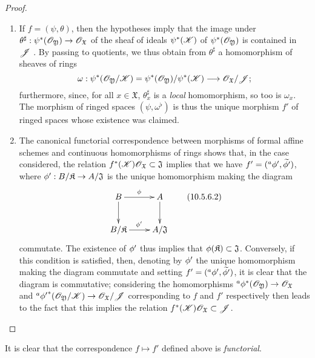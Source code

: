 \begin{proof}
\label{proof-1.10.5.6}
\medskip\noindent
\begin{enumerate}[label=(\roman*)]
  \item If $f=(\psi,\theta)$, then the hypotheses imply that the image under $\theta^\sharp:\psi^*(\sh{O}_\mathfrak{Y})\to\sh{O}_\mathfrak{X}$ of the sheaf of ideals $\psi^*(\mathscr{K})$ of $\psi^*(\mathscr{O}_\mathfrak{Y})$ is contained in $\mathscr{J}$ .
    By passing to quotients, we thus obtain from $\theta^\sharp$ a homomorphism of sheaves of rings
    \[
      \omega:\psi^*(\sh{O}_\mathfrak{Y}/\sh{K})=\psi^*(\sh{O}_\mathfrak{Y})/\psi^*(\sh{K})\to\sh{O}_\mathfrak{X}/\sh{J};
    \]
    furthermore, since, for all $x\in\mathfrak{X}$, $\theta_x^\sharp$ is a \emph{local} homomorphism, so too is $\omega_x$.
    The morphism of ringed spaces $(\psi,\omega^\flat)$ is thus  the unique morphism $f'$ of ringed spaces whose existence was claimed.
  \item The canonical functorial correspondence between morphisms of formal affine schemes and continuous homomorphisms of rings  shows that, in the case considered, the relation $f^*(\mathscr{K})\mathscr{O}_\mathfrak{X}\subset\mathfrak{J}$ implies that we have $f'=({}^a\phi',\widetilde{\phi'})$, where $\vphi':B/\mathfrak{K}\to A/\mathfrak{J}$ is the unique homomorphism making the diagram
    \begin{equation*}
    \label{1.10.5.6.2}
      \xymatrix{
        B\ar[r]^\vphi\ar[d] &
        A\ar[d]\\
        B/\mathfrak{K}\ar[r]^{\vphi'} &
        A/\mathfrak{J}
      }
      \tag{10.5.6.2}
    \end{equation*}
    commutate.
    The existence of $\phi'$ thus implies that $\phi(\mathfrak{K})\subset\mathfrak{J}$.
    Conversely, if this condition is satisfied, then, denoting by $\phi'$ the unique homomorphism making the diagram  commutate and setting $f'=({}^a\phi',\widetilde{\phi'})$, it is clear that the diagram  is commutative; considering the homomorphisms ${}^a\vphi^*(\sh{O}_\mathfrak{Y})\to\sh{O}_\mathfrak{X}$ and ${}^a{\vphi'}^*(\sh{O}_\mathfrak{Y}/\sh{K})\to\sh{O}_\mathfrak{X}/\sh{J}$ corresponding to $f$ and $f'$ respectively then leads to the fact that this implies the relation $f^*(\mathscr{K})\mathscr{O}_\mathfrak{X}\subset\mathscr{J}$.
\end{enumerate}
\end{proof}

It is clear that the correspondence $f\mapsto f'$ defined above is \emph{functorial}.

